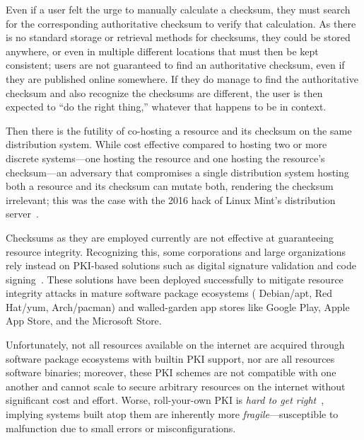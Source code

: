 Even if a user felt the urge to manually calculate a checksum, they must search
for the corresponding authoritative checksum to verify that calculation. As
there is no standard storage or retrieval methods for checksums, they could be
stored anywhere, or even in multiple different locations that must then be kept
consistent; users are not guaranteed to find an authoritative checksum, even if
they are published online somewhere. If they do manage to find the authoritative
checksum and also recognize the checksums are different, the user is then
expected to ``do the right thing,'' whatever that happens to be in context.

Then there is the futility of co-hosting a resource and its checksum on the same
distribution system. While cost effective compared to hosting two or more
discrete systems---one hosting the resource and one hosting the resource's
checksum---an adversary that compromises a single distribution system hosting
both a resource and its checksum can mutate both, rendering the checksum
irrelevant; this was the case with the 2016 hack of Linux Mint's distribution
server~\cite{SCA-MINT1, SCA-MINT2}.

Checksums as they are employed currently are not effective at guaranteeing
resource integrity. Recognizing this, some corporations and large organizations
rely instead on PKI-based solutions such as digital signature validation and
code signing~\cite{PKI}. These solutions have been deployed successfully to
mitigate resource integrity attacks in mature software package ecosystems (\eg
Debian/apt, Red Hat/yum, Arch/pacman) and walled-garden app stores like Google
Play, Apple App Store, and the Microsoft Store.


Unfortunately, not all resources available on the internet are acquired through
software package ecosystems with builtin PKI support, nor are all resources
software binaries; moreover, these PKI schemes are not compatible with one
another and cannot scale to secure arbitrary resources on the internet without
significant cost and effort. Worse, roll-your-own PKI is \emph{hard to get
right}~\cite{PKI}, implying systems built atop them are inherently more
\emph{fragile}---susceptible to malfunction due to small errors or
misconfigurations.

